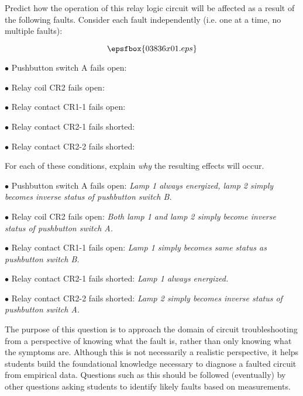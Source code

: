 

Predict how the operation of this relay logic circuit will be affected as a result of the following faults.  Consider each fault independently (i.e. one at a time, no multiple faults):

$$\epsfbox{03836x01.eps}$$

\medskip
\item{$\bullet$} Pushbutton switch A fails open:
\vskip 5pt
\item{$\bullet$} Relay coil CR2 fails open:
\vskip 5pt
\item{$\bullet$} Relay contact CR1-1 fails open:
\vskip 5pt
\item{$\bullet$} Relay contact CR2-1 fails shorted:
\vskip 5pt
\item{$\bullet$} Relay contact CR2-2 fails shorted:
\medskip

For each of these conditions, explain {\it why} the resulting effects will occur.







\medskip
\item{$\bullet$} Pushbutton switch A fails open: {\it Lamp 1 always energized, lamp 2 simply becomes inverse status of pushbutton switch B.}
\vskip 5pt
\item{$\bullet$} Relay coil CR2 fails open: {\it Both lamp 1 and lamp 2 simply become inverse status of pushbutton switch A.}
\vskip 5pt
\item{$\bullet$} Relay contact CR1-1 fails open: {\it Lamp 1 simply becomes same status as pushbutton switch B.}
\vskip 5pt
\item{$\bullet$} Relay contact CR2-1 fails shorted: {\it Lamp 1 always energized.}
\vskip 5pt
\item{$\bullet$} Relay contact CR2-2 fails shorted: {\it Lamp 2 simply becomes inverse status of pushbutton switch A.}
\medskip







The purpose of this question is to approach the domain of circuit troubleshooting from a perspective of knowing what the fault is, rather than only knowing what the symptoms are.  Although this is not necessarily a realistic perspective, it helps students build the foundational knowledge necessary to diagnose a faulted circuit from empirical data.  Questions such as this should be followed (eventually) by other questions asking students to identify likely faults based on measurements.




